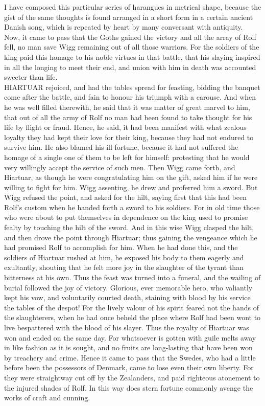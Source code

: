 \documentclass[10pt,a4paper]{report}
\begin{document}
I have composed this particular series of harangues in metrical shape, because the gist of the same thoughts is found arranged in a short form in a certain ancient Danish song, which is repeated by heart by many conversant with antiquity.\\

Now, it came to pass that the Goths gained the victory and all the array of Rolf fell, no man save Wigg remaining out of all those warriors. For the soldiers of the king paid this homage to his noble virtues in that battle, that his slaying inspired in all the longing to meet their end, and union with him in death was accounted sweeter than life.\\

HIARTUAR rejoiced, and had the tables spread for feasting, bidding the banquet come after the battle, and fain to honour his triumph with a carouse. And when he was well filled therewith, he said that it was matter of great marvel to him, that out of all the army of Rolf no man had been found to take thought for his life by flight or fraud. Hence, he said, it had been manifest with what zealous loyalty they had kept their love for their king, because they had not endured to survive him. He also blamed his ill fortune, because it had not suffered the homage of a single one of them to be left for himself: protesting that he would very willingly accept the service of such men. Then Wigg came forth, and Hiartuar, as though he were congratulating him on the gift, asked him if he were willing to fight for him. Wigg assenting, he drew and proferred him a sword. But Wigg refused the point, and asked for the hilt, saying first that this had been Rolf's custom when he handed forth a sword to his soldiers. For in old time those who were about to put themselves in dependence on the king used to promise fealty by touching the hilt of the sword. And in this wise Wigg clasped the hilt, and then drove the point through Hiartuar; thus gaining the vengeance which he had promised Rolf to accomplish for him. When he had done this, and the soldiers of Hiartuar rushed at him, he exposed his body to them eagerly and exultantly, shouting that he felt more joy in the slaughter of the tyrant than bitterness at his own. Thus the feast was turned into a funeral, and the wailing of burial followed the joy of victory. Glorious, ever memorable hero, who valiantly kept his vow, and voluntarily courted death, staining with blood by his service the tables of the despot! For the lively valour of his spirit feared not the hands of the slaughterers, when he had once beheld the place where Rolf had been wont to live bespattered with the blood of his slayer. Thus the royalty of Hiartuar was won and ended on the same day. For whatsoever is gotten with guile melts away in like fashion as it is sought, and no fruits are long-lasting that have been won by treachery and crime. Hence it came to pass that the Swedes, who had a little before been the possessors of Denmark, came to lose even their own liberty. For they were straightway cut off by the Zealanders, and paid righteous atonement to the injured shades of Rolf. In this way does stern fortune commonly avenge the works of craft and cunning.\\
\end{document}
